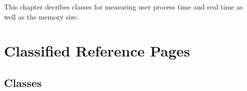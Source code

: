 


This chapter decribes classes for measuring user process time and real time
as well as the memory size.


\section{Classified Reference Pages}

\subsection*{Classes}
\\
\\
\\
